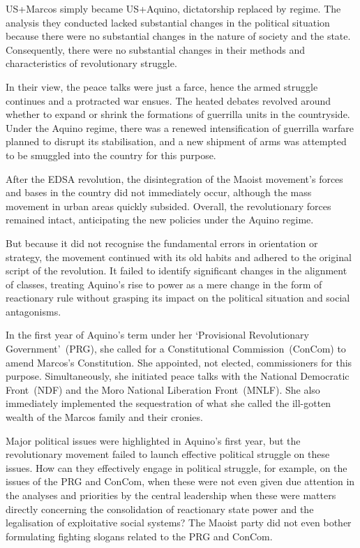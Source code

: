 US+Marcos simply became US+Aquino, 
dictatorship replaced by regime. 
The analysis they conducted lacked substantial changes 
in the political situation 
because there were no substantial changes 
in the nature of society and the state. 
Consequently, 
there were no substantial changes 
in their methods and characteristics of revolutionary struggle.

In their view, 
the peace talks were just a farce, 
hence the armed struggle continues and a protracted war ensues. 
The heated debates revolved around 
whether to expand or shrink the formations of guerrilla units 
in the countryside. 
Under the Aquino regime, 
there was a renewed intensification of guerrilla warfare 
planned to disrupt its stabilisation, 
and a new shipment of arms was attempted 
to be smuggled into the country for this purpose.

After the EDSA revolution, 
the disintegration of the Maoist movement's forces and bases in the country
did not immediately occur, 
although the mass movement in urban areas quickly subsided. 
Overall, 
the revolutionary forces remained intact, 
anticipating the new policies under the Aquino regime.

But because it did not recognise 
the fundamental errors in orientation or strategy, 
the movement continued with its old habits 
and adhered to the original script of the revolution. 
It failed to identify significant changes in the alignment of classes, 
treating Aquino's rise to power 
as a mere change in the form of reactionary rule 
without grasping its impact on the political situation and social antagonisms.

In the first year of Aquino's term 
under her `Provisional Revolutionary Government'~(PRG), 
she called for a Constitutional Commission~(ConCom) 
to amend Marcos's Constitution. 
She appointed, not elected, commissioners for this purpose. 
Simultaneously, 
she initiated peace talks with the National Democratic Front~(NDF) 
and the Moro National Liberation Front~(MNLF). 
She also immediately implemented the sequestration 
of what she called the ill-gotten wealth of the Marcos family and their cronies.

Major political issues were highlighted 
in Aquino's first year, 
but the revolutionary movement failed 
to launch effective political struggle on these issues. 
How can they effectively engage in political struggle, 
for example, on the issues of the PRG and ConCom,
when these were not even given due attention 
in the analyses and priorities by the central leadership
when these were matters 
directly concerning the consolidation of reactionary state power 
and the legalisation of exploitative social systems? 
The Maoist party did not even bother 
formulating fighting slogans related to the PRG and ConCom.

